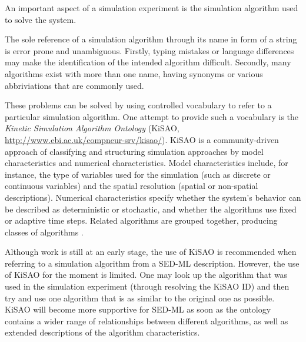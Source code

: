 \label{sec:kisao}

An important aspect of a simulation experiment is the simulation algorithm used to solve the system.

The sole reference of a simulation algorithm through its name in form of a string is error prone and unambiguous. Firstly, typing mistakes or language differences may make the identification of the intended algorithm difficult. Secondly, many algorithms exist with more than one name, having synonyms or various abbriviations that are commonly used.

These problems can be solved by using controlled vocabulary to refer to a particular simulation algorithm. One attempt to provide such a vocabulary is the \emph{Kinetic Simulation Algorithm Ontology} (KiSAO, \url{http://www.ebi.ac.uk/compneur-srv/kisao/}). KiSAO is a community-driven approach of classifying and structuring simulation approaches by model characteristics and numerical characteristics.  Model characteristics include, for instance, the type of variables used for the simulation (such as discrete or continuous variables) and the spatial resolution (spatial or non-spatial descriptions). Numerical characteristics specify whether the system's behavior can be described as deterministic or stochastic, and whether the algorithms use fixed or adaptive time steps.  
Related algorithms are grouped together, producing classes of algorithms \citep{CWK+10}.

Although work is still at an early stage, the use of KiSAO is recommended when referring to a simulation algorithm from a SED-ML description. However, the use of KiSAO for the moment is limited. One may look up the algorithm that was used in the simulation experiment (through resolving the KiSAO ID) and then try and use one algorithm that is as similar to the original one as possible. KiSAO will become more supportive for SED-ML as soon as the ontology contains a wider range of relationships between different algorithms, as well as extended descriptions of the algorithm characteristics.


